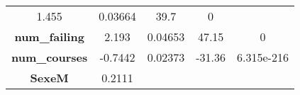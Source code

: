 \documentclass[]{book}
\theoremstyle{definition}
\theoremstyle{definition}
\theoremstyle{remark}
\begin{document}
\begin{longtable}[]{@{}ccccc@{}}
\begin{minipage}[t]{0.13\columnwidth}
1.455\strut
\end{minipage} & \begin{minipage}[t]{0.16\columnwidth}\centering\strut
0.03664\strut
\end{minipage} & \begin{minipage}[t]{0.12\columnwidth}\centering\strut
39.7\strut
\end{minipage} & \begin{minipage}[t]{0.12\columnwidth}\centering\strut
0\strut
\end{minipage}\tabularnewline
\begin{minipage}[t]{0.30\columnwidth}\centering\strut
\textbf{num\_failing}\strut
\end{minipage} & \begin{minipage}[t]{0.13\columnwidth}\centering\strut
2.193\strut
\end{minipage} & \begin{minipage}[t]{0.16\columnwidth}\centering\strut
0.04653\strut
\end{minipage} & \begin{minipage}[t]{0.12\columnwidth}\centering\strut
47.15\strut
\end{minipage} & \begin{minipage}[t]{0.12\columnwidth}\centering\strut
0\strut
\end{minipage}\tabularnewline
\begin{minipage}[t]{0.30\columnwidth}\centering\strut
\textbf{num\_courses}\strut
\end{minipage} & \begin{minipage}[t]{0.13\columnwidth}\centering\strut
-0.7442\strut
\end{minipage} & \begin{minipage}[t]{0.16\columnwidth}\centering\strut
0.02373\strut
\end{minipage} & \begin{minipage}[t]{0.12\columnwidth}\centering\strut
-31.36\strut
\end{minipage} & \begin{minipage}[t]{0.12\columnwidth}\centering\strut
6.315e-216\strut
\end{minipage}\tabularnewline
\begin{minipage}[t]{0.30\columnwidth}\centering\strut
\textbf{SexeM}\strut
\end{minipage} & \begin{minipage}[t]{0.13\columnwidth}\centering\strut
0.2111\strut
\end{minipage} & \begin{minipage}[t]{0.16\columnwidth}\centering\strut

\end{minipage}
\end{longtable}
\end{document}
